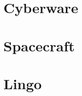 \documentclass[10pt,twoside]{article}
\begin{document}

  \section{Cyberware}

  \newpage


  \section{Spacecraft}

  \newpage


  \section{Lingo}
\end{document}
